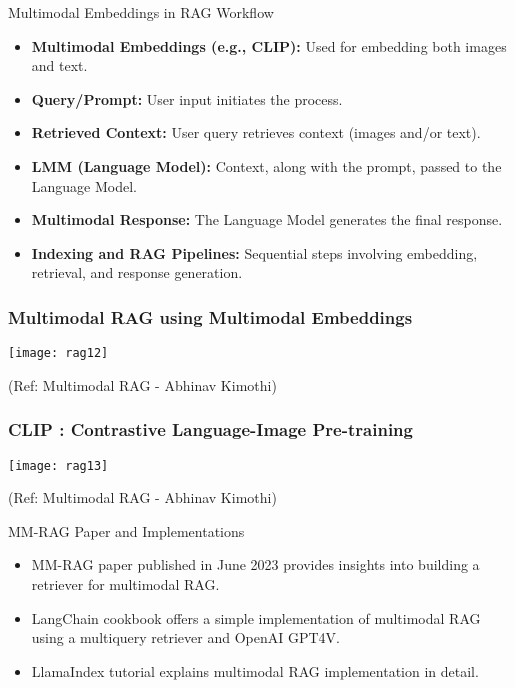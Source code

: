 \begin{frame}[fragile]{Multimodal Embeddings in RAG Workflow}
    \begin{itemize}
        \item \textbf{Multimodal Embeddings (e.g., CLIP):} Used for embedding both images and text.
        \item \textbf{Query/Prompt:} User input initiates the process.
        \item \textbf{Retrieved Context:} User query retrieves context (images and/or text).
        \item \textbf{LMM (Language Model):} Context, along with the prompt, passed to the Language Model.
        \item \textbf{Multimodal Response:} The Language Model generates the final response.
        \item \textbf{Indexing and RAG Pipelines:} Sequential steps involving embedding, retrieval, and response generation.
    \end{itemize}
\end{frame}


\begin{frame}[fragile]\frametitle{Multimodal RAG using Multimodal Embeddings}


		\begin{center}
		\texttt{[image: rag12]}
		\end{center}

{\tiny (Ref: Multimodal RAG - Abhinav  Kimothi)}

\end{frame}

\begin{frame}[fragile]\frametitle{CLIP : Contrastive Language-Image Pre-training}


		\begin{center}
		\texttt{[image: rag13]}
		\end{center}

{\tiny (Ref: Multimodal RAG - Abhinav  Kimothi)}

\end{frame}


\begin{frame}[fragile]{MM-RAG Paper and Implementations}
    \begin{itemize}
        \item MM-RAG paper published in June 2023 provides insights into building a retriever for multimodal RAG.
        \item LangChain cookbook offers a simple implementation of multimodal RAG using a multiquery retriever and OpenAI GPT4V.
        \item LlamaIndex tutorial explains multimodal RAG implementation in detail.
    \end{itemize}
\end{frame}

